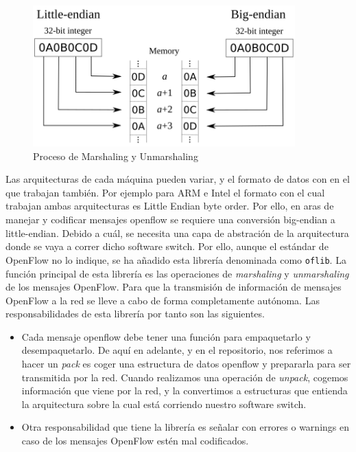 \begin{figure}[ht]
    \centering
    \includegraphics[width=0.9\textwidth]{archivos/img/teoria/bofuss6.png}
    \caption{Proceso de Marshaling y Unmarshaling }
    \label{fig:bofuss6}
\end{figure}

Las arquitecturas de cada máquina pueden variar, y el formato de datos con en el que trabajan también. Por ejemplo para ARM e Intel el formato con el cual trabajan ambas arquitecturas es Little Endian byte order. Por ello, en aras de manejar y codificar mensajes openflow se requiere una conversión big-endian a little-endian. Debido a cuál, se necesita una capa de abstración de la arquitectura donde se vaya a correr dicho software switch. Por ello, aunque el estándar de OpenFlow no lo indique, se ha añadido esta librería denominada como \texttt{oflib}. La función principal de esta librería es las operaciones de  \textit{marshaling} y \textit{unmarshaling} de los mensajes OpenFlow. Para que la transmisión de información de mensajes OpenFlow a la red se lleve a cabo de forma completamente autónoma. Las responsabilidades de esta librería por tanto son las siguientes.

\begin{itemize}
    \item Cada mensaje openflow debe tener una función para empaquetarlo y desempaquetarlo. De aquí en adelante, y en el repositorio, nos referimos a hacer un \textit{pack} es coger una estructura de datos openflow y prepararla para ser transmitida por la red. Cuando realizamos una operación de \textit{unpack}, cogemos información que viene por la red, y la convertimos a estructuras que entienda la arquitectura sobre la cual está corriendo nuestro software switch.
    \item Otra responsabilidad que tiene la librería es señalar con errores o warnings en caso de los mensajes OpenFlow estén mal codificados.
\end{itemize}


